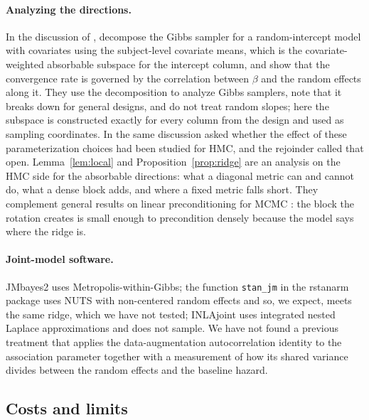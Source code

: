 \paragraph{Analyzing the directions.} In the discussion of
\citet{zanella2021}, \citet{yang2021} decompose the Gibbs sampler for a
random-intercept model with covariates using the subject-level covariate
means, which is the covariate-weighted absorbable subspace for the
intercept column, and show that the convergence rate is governed by the
correlation between $\beta$ and the random effects along it. They use the
decomposition to analyze Gibbs samplers, note that it breaks down for
general designs, and do not treat random slopes; here the subspace is
constructed exactly for every column from the design and used as sampling
coordinates. In the same discussion \citet{robert2021} asked whether the
effect of these parameterization choices had been studied for HMC, and the
rejoinder \citep{zanella2021} called that open. Lemma~\ref{lem:local} and
Proposition~\ref{prop:ridge} are an analysis on the HMC side for the
absorbable directions: what a diagonal metric can and cannot do, what a
dense block adds, and where a fixed metric falls short. They complement
general results on linear preconditioning for MCMC
\citep{hirdlivingstone2025}: the block the rotation creates is small enough
to precondition densely because the model says where the ridge is.

\paragraph{Joint-model software.} JMbayes2 \citep{jmbayes2} uses
Metropolis-within-Gibbs; the function \texttt{stan\_jm} in the rstanarm package
\citep{brilleman2018} uses NUTS with non-centered random effects and so, we
expect, meets the same ridge, which we have not tested; INLAjoint
\citep{rustand2024} uses integrated nested Laplace approximations and does
not sample. We have not found a previous treatment that applies the
data-augmentation autocorrelation identity \citep{liu1994} to the
association parameter together with a measurement of how its shared
variance divides between the random effects and the baseline hazard.

\subsection{Costs and limits}

